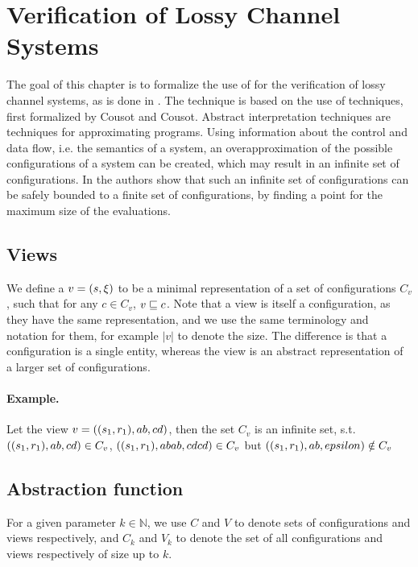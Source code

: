 \newpage
\section{Verification of Lossy Channel Systems}
\label{model}
The goal of this chapter is to formalize the use of  for the verification of lossy channel systems, as is done in \cite{parosh}. The technique is based on the use of  techniques, first formalized by Cousot and Cousot\cite{cousot1977}. Abstract interpretation techniques are techniques for approximating programs. Using information about the control and data flow, i.e. the semantics of a system, an overapproximation of the possible configurations of a system can be created, which may result in an infinite set of configurations. In \cite{parosh} the authors show that such an infinite set of configurations can be safely bounded to a finite set of configurations, by finding a  point for the maximum size of the evaluations.


\subsection{Views}
\label{subwords}
We define a  $v= (s, \xi)$ to be a minimal representation of a set of configurations $C_v$, such that for any $c \in C_v$, $v \sqsubseteq c$. Note that a view is itself a configuration, as they have the same representation, and we use the same terminology and notation for them, for example $|v|$ to denote the size. The difference is that a configuration is a single entity, whereas the view is an abstract representation of a larger set of configurations.

\paragraph{Example.} Let the view $v = ((s_1, r_1), ab, cd)$, then the set $C_v$ is an infinite set, s.t. $((s_1, r_1), ab, cd) \in C_v$, $((s_1, r_1), abab, cdcd) \in C_v$ but $((s_1, r_1), ab, epsilon) \notin C_v$


\subsection{Abstraction function}
\label{alphagamma}
For a given parameter $k \in \mathbb{N}$, we use $C$ and $V$ to denote sets of configurations and views respectively, and $C_k$ and $V_k$ to denote the set of all configurations and views respectively of size up to $k$.

